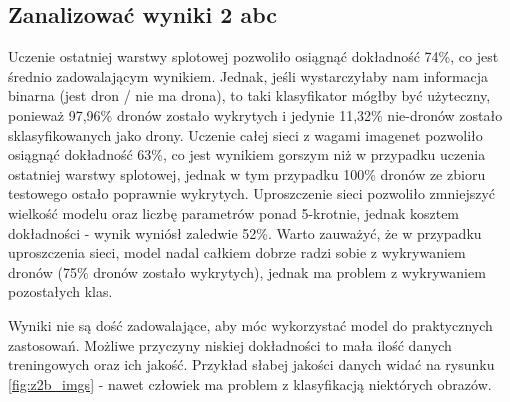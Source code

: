 \subsection{Zanalizować wyniki 2 abc}
Uczenie ostatniej warstwy splotowej pozwoliło osiągnąć dokładność 74\%, co jest średnio zadowalającym wynikiem. Jednak, jeśli wystarczyłaby nam informacja binarna (jest dron / nie ma drona), to taki klasyfikator mógłby być użyteczny, ponieważ 97,96\% dronów zostało wykrytych i jedynie 11,32\% nie-dronów zostało sklasyfikowanych jako drony. Uczenie całej sieci z wagami imagenet pozwoliło osiągnąć dokładność 63\%, co jest wynikiem gorszym niż w przypadku uczenia ostatniej warstwy splotowej, jednak w tym przypadku 100\% dronów ze zbioru testowego ostało poprawnie wykrytych. Uproszczenie sieci pozwoliło zmniejszyć wielkość modelu oraz liczbę parametrów ponad 5-krotnie, jednak kosztem dokładności - wynik wyniósł zaledwie 52\%. Warto zauważyć, że w przypadku uproszczenia sieci, model nadal całkiem dobrze radzi sobie z wykrywaniem dronów (75\% dronów zostało wykrytych), jednak ma problem z wykrywaniem pozostałych klas.

Wyniki nie są dość zadowalające, aby móc wykorzystać model do praktycznych zastosowań. Możliwe przyczyny niskiej dokładności to mała ilość danych treningowych oraz ich jakość. Przykład słabej jakości danych widać na rysunku \ref{fig:z2b_imgs} - nawet człowiek ma problem z klasyfikacją niektórych obrazów. 